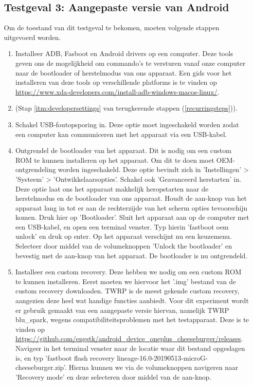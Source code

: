 \subsection{Testgeval 3: Aangepaste versie van Android}

Om de toestand van dit testgeval te bekomen, moeten volgende stappen uitgevoerd worden.

\begin{enumerate}
    \item Installeer ADB, Fasboot en Android drivers op een computer. Deze tools geven ons de mogelijkheid om commando's te versturen vanaf onze computer naar de bootloader of herstelmodus van ons apparaat. Een gids voor het installeren van deze tools op verschillende platforms is te vinden op \url{https://www.xda-developers.com/install-adb-windows-macos-linux/}.
    
    \item 
     (Stap \ref{itm:developersettings} van terugkerende stappen (\ref{recurringsteps})).
    
    \item Schakel USB-foutopsporing in. Deze optie moet ingeschakeld worden zodat een computer kan communiceren met het apparaat via een USB-kabel.
    
    \item Ontgrendel de bootloader van het apparaat. Dit is nodig om een custom ROM te kunnen installeren op het apparaat. Om dit te doen moet OEM-ontgrendeling worden ingeschakeld. Deze optie bevindt zich in 'Instellingen' > 'Systeem' > 'Ontwikkelaarsopties'. Schakel ook 'Geavanceerd herstarten' in. Deze optie laat ons het apparaat makkelijk heropstarten naar de herstelmodus en de bootloader van ons apparaat. Houdt de aan-knop van het apparaat lang in tot er aan de rechterzijde van het scherm opties tevoorschijn komen. Druk hier op 'Bootloader'. Sluit het apparaat aan op de computer met een USB-kabel, en open een terminal venster. Typ hierin 'fastboot oem unlock' en druk op enter. Op het apparaat verschijnt nu een keuzemenu. Selecteer door middel van de volumeknoppen 'Unlock the bootloader' en bevestig met de aan-knop van het apparaat. De bootloader is nu ontgrendeld.
    
    \item 
    Installeer een custom recovery. Deze hebben we nodig om een custom ROM te kunnen installeren. Eerst moeten we hiervoor het '.img' bestand van de custom recovery downloaden. TWRP is de meest gekende custom recovery, aangezien deze heel wat handige functies aanbiedt. Voor dit experiment wordt er gebruik gemaakt van een aangepaste versie hiervan, namelijk TWRP blu\_spark, wegens compatibiliteitsproblemen met het testapparaat. Deze is te vinden op \url{https://github.com/engstk/android_device_oneplus_cheeseburger/releases}. Navigeer in het terminal venster naar de locatie waar dit bestand opgeslagen is, en typ 'fastboot flash recovery lineage-16.0-20190513-microG-cheeseburger.zip'. Hierna kunnen we via de volumeknoppen navigeren naar 'Recovery mode' en deze selecteren door middel van de aan-knop.
    

\end{enumerate}
